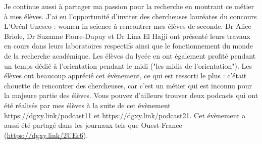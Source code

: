 \documentclass[french, 10pt]{article}
\begin{document}
Je continue aussi à partager ma passion pour la recherche en montrant ce métier à mes élèves. J'ai eu l'opportunité d'inviter des chercheuses lauréates du concours L'Oréal Unesco : women in science à rencontrer mes élèves de seconde. Dr Alice Briole, Dr Suzanne Faure-Dupuy et Dr Lina El Hajji ont présenté leurs travaux en cours dans leurs laboratoires respectifs ainsi que le fonctionnement du monde de la recherche académique. Les élèves du lycée en ont également profité pendant un temps dédié à l'orientation pendant le midi ("les midis de l'orientation").  Les élèves ont beaucoup apprécié cet évènement, ce qui est ressorti le plus : c'était chouette de rencontrer des chercheuses, car c'est un métier qui est inconnu pour la majeure partie des élèves. Vous pouvez d'ailleurs trouver deux podcasts qui ont été réalisés par mes élèves à la suite de cet évènement \url{https://dgxy.link/podcast11} et \url{https://dgxy.link/podcast21}. Cet évènement a aussi été partagé dans les journaux tels que Ouest-France (\url{https://dgxy.link/2UEr6}).\medskip



\medskip




  

\end{document}
